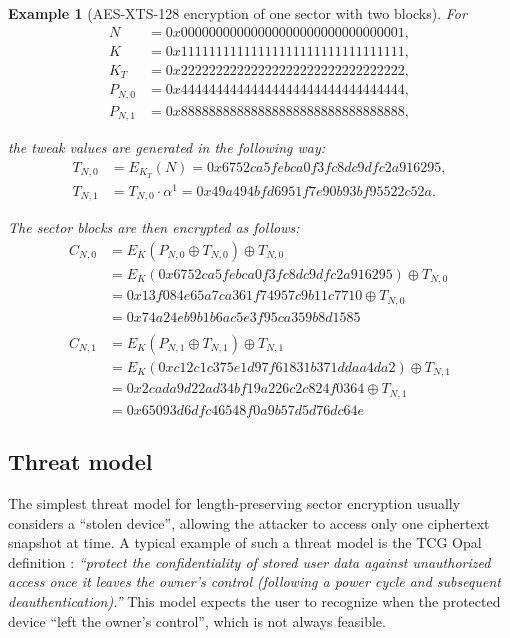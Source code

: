 \documentclass[a4paper]{article}
\newtheorem{example}{Example}
\begin{document}
\begin{example}[AES-XTS-128 encryption of one sector with two blocks]\hfill\break
\indent For
\begin{align*}
N       & = 0x00000000000000000000000000000001, \\
K       & = 0x11111111111111111111111111111111, \\
K_T     & = 0x22222222222222222222222222222222, \\
P_{N,0} & = 0x44444444444444444444444444444444, \\
P_{N,1} & = 0x88888888888888888888888888888888,
\end{align*}

the tweak values are generated in the following way:
\begin{align*}
T_{N,0} & = E_{K_T}(N)             = 0x6752ca5febca0f3fc8dc9dfc2a916295, \\
T_{N,1} & = T_{N,0} \cdot \alpha^1 = 0x49a494bfd6951f7e90b93bf95522c52a.
\end{align*}

The sector blocks are then encrypted as follows:
\begin{align*}
C_{N,0} & = E_K(P_{N,0} \oplus T_{N,0}) \oplus T_{N,0} \\
        & = E_K(0x6752ca5febca0f3fc8dc9dfc2a916295) \oplus T_{N,0} \\
        & = 0x13f084e65a7ca361f74957c9b11c7710 \oplus T_{N,0} \\
        & = 0x74a24eb9b1b6ac5e3f95ca359b8d1585 \\
\\
C_{N,1} & = E_K(P_{N,1} \oplus T_{N,1}) \oplus T_{N,1} \\
        & = E_K(0xc12c1c375e1d97f61831b371ddaa4da2) \oplus T_{N,1} \\
        & = 0x2cada9d22ad34bf19a226c2c824f0364 \oplus T_{N,1} \\
        & = 0x65093d6dfc46548f0a9b57d5d76dc64e
\end{align*}

\end{example}

\subsection{Threat model}
The simplest threat model for length-preserving sector encryption usually considers a ``stolen device'', allowing the attacker to access only one ciphertext snapshot at time.
A typical example of such a threat model is the TCG Opal definition \cite{tcgopal}:
\emph{``protect the confidentiality of stored user data against unauthorized access once it leaves the owner's control (following a power cycle and subsequent deauthentication).''}
This model expects the user to recognize when the protected device ``left the owner's control'', which is not always feasible.
\end{document}
